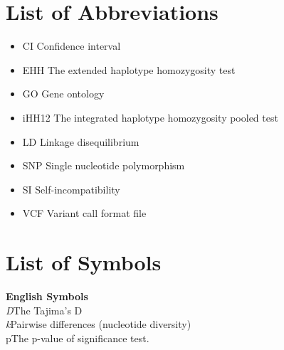\newpage
{}
\setcounter{page}{0}
\tableofcontents

\newpage
\cleardoublepage
{}
\listoffigures


\newpage
\section{List of Abbreviations}
\noindent
\begin{itemize}[label={},leftmargin=0in]
    \item CI \textemdash Confidence interval
    \item EHH \textemdash The extended haplotype homozygosity test
    \item GO \textemdash Gene ontology
    \item iHH12 \textemdash The integrated haplotype homozygosity pooled test
    \item LD \textemdash Linkage disequilibrium
    \item SNP \textemdash Single nucleotide polymorphism 
    \item SI \textemdash Self-incompatibility
    \item VCF \textemdash Variant call format file
\end{itemize}

\newpage
\section{List of Symbols}
\noindent
\textbf{English Symbols}\\
 \emph{D}\tabto{2cm}The Tajima's D\\
 \emph{k}\tabto{2cm}Pairwise differences (nucleotide diversity)\\
 p\tabto{2cm}The p-value of significance test.\\


\setlength{\parindent}{15pt}
